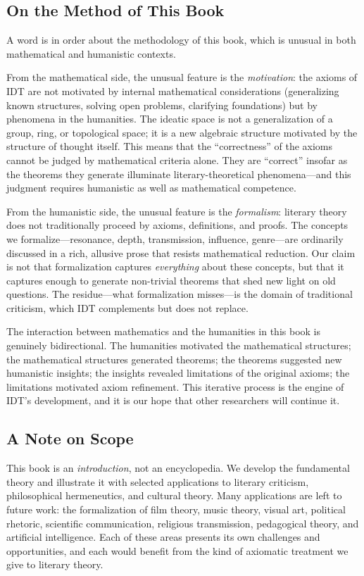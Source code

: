 \documentclass[11pt,openany]{book}
\theoremstyle{definition}
\theoremstyle{plain}
\theoremstyle{remark}
\begin{document}
\subsection*{On the Method of This Book}

A word is in order about the methodology of this book, which is unusual in both mathematical and humanistic contexts.

From the mathematical side, the unusual feature is the \emph{motivation}: the axioms of IDT are not motivated by internal mathematical considerations (generalizing known structures, solving open problems, clarifying foundations) but by phenomena in the humanities. The ideatic space is not a generalization of a group, ring, or topological space; it is a new algebraic structure motivated by the structure of thought itself. This means that the ``correctness'' of the axioms cannot be judged by mathematical criteria alone. They are ``correct'' insofar as the theorems they generate illuminate literary-theoretical phenomena---and this judgment requires humanistic as well as mathematical competence.

From the humanistic side, the unusual feature is the \emph{formalism}: literary theory does not traditionally proceed by axioms, definitions, and proofs. The concepts we formalize---resonance, depth, transmission, influence, genre---are ordinarily discussed in a rich, allusive prose that resists mathematical reduction. Our claim is not that formalization captures \emph{everything} about these concepts, but that it captures enough to generate non-trivial theorems that shed new light on old questions. The residue---what formalization misses---is the domain of traditional criticism, which IDT complements but does not replace.

The interaction between mathematics and the humanities in this book is genuinely bidirectional. The humanities motivated the mathematical structures; the mathematical structures generated theorems; the theorems suggested new humanistic insights; the insights revealed limitations of the original axioms; the limitations motivated axiom refinement. This iterative process is the engine of IDT's development, and it is our hope that other researchers will continue it.

\subsection*{A Note on Scope}

This book is an \emph{introduction}, not an encyclopedia. We develop the fundamental theory and illustrate it with selected applications to literary criticism, philosophical hermeneutics, and cultural theory. Many applications are left to future work: the formalization of film theory, music theory, visual art, political rhetoric, scientific communication, religious transmission, pedagogical theory, and artificial intelligence. Each of these areas presents its own challenges and opportunities, and each would benefit from the kind of axiomatic treatment we give to literary theory.
\end{document}
